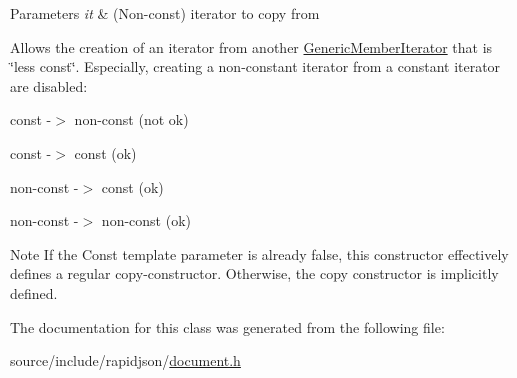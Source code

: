 \begin{DoxyParams}{Parameters}
{\em it} & (Non-\/const) iterator to copy from\\
\hline
\end{DoxyParams}
Allows the creation of an iterator from another \hyperlink{class_generic_member_iterator}{Generic\+Member\+Iterator} that is \char`\"{}less const\char`\"{}. Especially, creating a non-\/constant iterator from a constant iterator are disabled\+: \begin{DoxyItemize}
\item const -\/$>$ non-\/const (not ok) \item const -\/$>$ const (ok) \item non-\/const -\/$>$ const (ok) \item non-\/const -\/$>$ non-\/const (ok)\end{DoxyItemize}
\begin{DoxyNote}{Note}
If the {\ttfamily Const} template parameter is already {\ttfamily false}, this constructor effectively defines a regular copy-\/constructor. Otherwise, the copy constructor is implicitly defined. 
\end{DoxyNote}


The documentation for this class was generated from the following file\+:\begin{DoxyCompactItemize}
\item 
source/include/rapidjson/\hyperlink{document_8h}{document.\+h}\end{DoxyCompactItemize}
